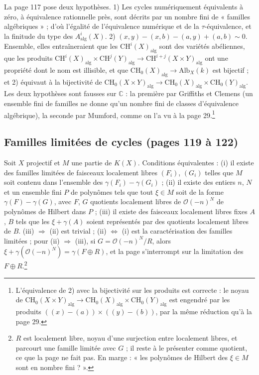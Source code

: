 \documentclass[11pt,a4paper]{article}
\begin{document}
La page 117 pose deux hypothèses. 1) Les cycles numériquement équivalents à
zéro, à équivalence rationnelle près, sont décrits par un nombre fini de
« familles algébriques » ; d'où l'égalité de l'équivalence numérique et de la
$\tau$-équivalence, et la finitude du type des $A^{i}_{\mathrm{alg}}(X)$. 2)
$(x, y) - (x, b) - (a, y) + (a, b) \sim 0$. Ensemble, elles entraîneraient que
les $\mathrm{CH}^{i}(X)_{\mathrm{alg}}$ sont des variétés abéliennes, que les
produits $\mathrm{CH}^{i}(X)_{\mathrm{alg}} \times
\mathrm{CH}^{j}(Y)_{\mathrm{alg}} \to \mathrm{CH}^{i+j}(X \times
Y)_{\mathrm{alg}}$ ont une propriété dont le nom est illisible, et que
$\mathrm{CH}_{0}(X)_{\mathrm{alg}} \to \mathrm{Alb}_{X}(k)$ est bijectif ; et 2)
équivaut à la bijectivité de $\mathrm{CH}_{0}(X \times Y)_{\mathrm{alg}} \to
\mathrm{CH}_{0}(X)_{\mathrm{alg}} \times \mathrm{CH}_{0}(Y)_{\mathrm{alg}}$. Les
deux hypothèses sont fausses sur $\mathbb{C}$ : la première par Griffiths et
Clemens (un ensemble fini de familles ne donne qu'un nombre fini de classes
d'équivalence algébrique), la seconde par Mumford, comme on l'a vu à la page
29.\footnote{L'équivalence de 2) avec la bijectivité sur les produits est
correcte : le noyau de $\mathrm{CH}_{0}(X \times Y)_{\mathrm{alg}} \to
\mathrm{CH}_{0}(X)_{\mathrm{alg}} \times \mathrm{CH}_{0}(Y)_{\mathrm{alg}}$ est
engendré par les produits $((x) - (a)) \times ((y) - (b))$, par la même
réduction qu'à la page 29.}

\subsection*{Familles limitées de cycles (pages 119 à 122)}

Soit $X$ projectif et $M$ une partie de $K(X)$. Conditions équivalentes : (i) il
existe des familles limitées de faisceaux localement libres $(F_{i})$, $(G_{i})$
telles que $M$ soit contenu dans l'ensemble des $\gamma(F_{i}) - \gamma(G_{i})$ ;
(ii) il existe des entiers $n$, $N$ et un ensemble fini $P$ de polynômes tels
que tout $\xi \in M$ soit de la forme $\gamma(F) - \gamma(G)$, avec $F$, $G$
quotients localement libres de $\mathcal{O}(-n)^{N}$ de polynômes de Hilbert dans
$P$ ; (iii) il existe des faisceaux localement libres fixes $A$, $B$ tels que les
$\xi + \gamma(A)$ soient représentés par des quotients localement libres de $B$.
(iii) $\Rightarrow$ (ii) est trivial ; (ii) $\Leftrightarrow$ (i) est la
caractérisation des familles limitées ; pour (ii) $\Rightarrow$ (iii), si $G =
\mathcal{O}(-n)^{N}/R$, alors $\xi + \gamma(\mathcal{O}(-n)^{N}) = \gamma(F \oplus
R)$, et la page s'interrompt sur la limitation des $F \oplus R$.\footnote{$R$ est
localement libre, noyau d'une surjection entre localement libres, et parcourt
une famille limitée avec $G$ ; il reste à le présenter comme quotient, ce que
la page ne fait pas. En marge : « les polynômes de Hilbert des $\xi \in M$ sont
en nombre fini ? ».}
\end{document}
